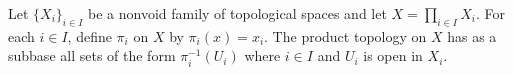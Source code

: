 Let $\{X_i\}_{i \in I}$ be a nonvoid family of topological spaces and let $X = \prod_{i \in I} X_i$. For each $i \in I$, define $\pi_i$ on $X$ by $\pi_i(x) = x_i$. The product topology on $X$ has as a subbase all sets of the form $\pi_i^{-1}(U_i)$ where $i \in I$ and $U_i$ is open in $X_i$.